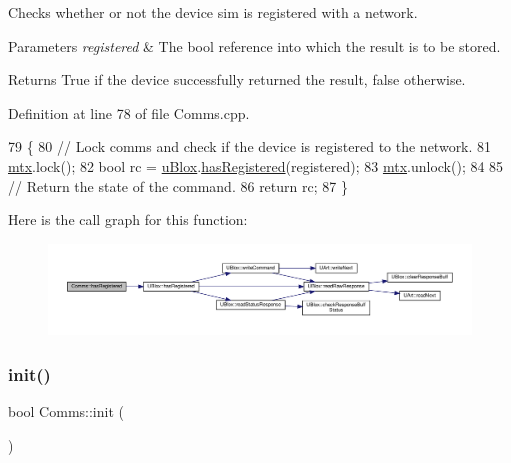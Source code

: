 Checks whether or not the device sim is registered with a network.


\begin{DoxyParams}{Parameters}
{\em registered} & The bool reference into which the result is to be stored. \\
\hline
\end{DoxyParams}
\begin{DoxyReturn}{Returns}
True if the device successfully returned the result, false otherwise. 
\end{DoxyReturn}


Definition at line 78 of file Comms.\+cpp.


\begin{DoxyCode}
79 \{
80     \textcolor{comment}{// Lock comms and check if the device is registered to the network.}
81     \hyperlink{class_comms_a21df861b1202573e4cd0cb5666d638fe}{mtx}.lock();
82     \textcolor{keywordtype}{bool} rc = \hyperlink{class_comms_ac64dea134b116147e5441172346dbd6c}{uBlox}.\hyperlink{class_u_blox_a1889c2b9bb6087bc939bd2a27b68623b}{hasRegistered}(registered);
83     \hyperlink{class_comms_a21df861b1202573e4cd0cb5666d638fe}{mtx}.unlock();
84 
85     \textcolor{comment}{// Return the state of the command.}
86     \textcolor{keywordflow}{return} rc;
87 \}
\end{DoxyCode}
Here is the call graph for this function\+:\nopagebreak
\begin{figure}[H]
\begin{center}
\leavevmode
\includegraphics[width=350pt]{d8/dcc/class_comms_ae1fb7ac11bd07f21134335aec55bd833_cgraph}
\end{center}
\end{figure}
\mbox{\label{class_comms_aa0519d3ed2d5bd6aad60101080ac2de7}} 
\subsubsection{\texorpdfstring{init()}{init()}}
{\footnotesize\ttfamily bool Comms\+::init (\begin{DoxyParamCaption}{ }\end{DoxyParamCaption})}

